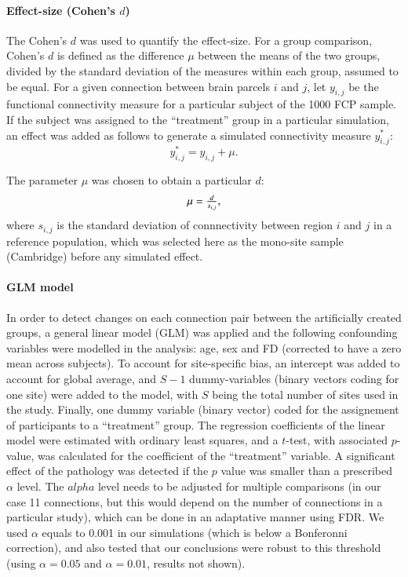 \documentclass[authoryear]{elsarticle}
\begin{document}
\paragraph{Effect-size (Cohen's $d$)}
The Cohen's $d$ was used to quantify the effect-size. For a group comparison, Cohen's $d$ is defined as the difference $\mu$ between the means of the two groups, divided by the standard deviation of the measures within each group, assumed to be equal. For a given connection between brain parcels $i$ and $j$, let $y_{i,j}$ be the functional connectivity measure for a particular subject of the 1000 FCP sample. If the subject was assigned to the ``treatment'' group in a particular simulation, an effect was added as follows to generate a simulated connectivity measure $y_{i,j}^*$:
\begin{equation}
	y^*_{i,j} = y_{i,j} + \mu.
\end{equation}

The parameter $\mu$ was chosen to obtain a particular $d$:
\begin{equation}
\label{eq_cohen}
   \begin{array}{l l}
     \mu = \frac{d}{s_{i,j}},     
   \end{array}
\end{equation}
where $s_{i,j}$ is the standard deviation of connnectivity between region $i$ and $j$ in a reference population, which was selected here as the mono-site sample (Cambridge) before any simulated effect.

\paragraph{GLM model}
In order to detect changes on each connection pair between the artificially created groups, a general linear model (GLM) was applied and the following confounding variables were modelled in the analysis: age, sex and FD (corrected to have a zero mean across subjects). To account for site-specific bias, an intercept was added to account for global average, and $S-1$ dummy-variables (binary vectors coding for one site) were added to the model, with $S$ being the total number of sites used in the study. Finally, one dummy variable (binary vector) coded for the assignement of participants to a ``treatment'' group. The regression coefficients of the linear model were estimated with ordinary least squares, and a $t$-test, with associated $p$-value, was calculated for the coefficient of the ``treatment'' variable. A significant effect of the pathology was detected if the $p$ value was smaller than a prescribed $\alpha$ level. The $alpha$ level needs to be adjusted for multiple comparisons (in our case 11 connections, but this would depend on the number of connections in a particular study), which can be done in an adaptative manner using FDR. We used $\alpha$ equals to 0.001 in our simulations (which is below a Bonferonni correction), and also tested that our conclusions were robust to this threshold (using $\alpha=0.05$ and $\alpha=0.01$, results not shown). 
\end{document}

